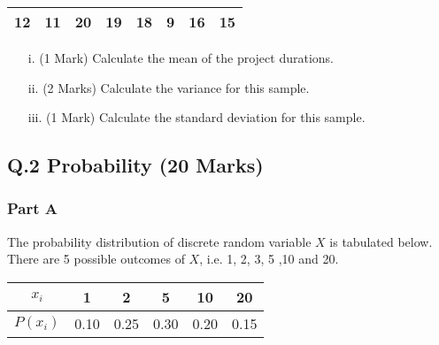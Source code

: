 \documentclass[a4paper,12pt]{article}
\begin{document}
\begin{table}[ht]
\begin{center}
\begin{tabular}{|rrrrrrrr|}

\hline
12 & 11 & 20 & 19 & 18 & 9 & 16 & 15 \\
\hline
\end{tabular}
\end{center}
\end{table}
\vspace{-0.5cm}


\begin{itemize}
\item[i.](1 Mark) Calculate the mean of the project durations.
\item[ii.](2 Marks) Calculate the variance for this sample.
\item[iii.](1 Mark) Calculate the standard deviation for this sample.
\end{itemize}





%

\newpage
\subsection*{Q.2 Probability (20 Marks)}
\subsubsection*{Part A}
 The probability distribution of discrete random variable $X$ is tabulated below. There are 5 possible outcomes of $X$, i.e. 1, 2, 3, 5 ,10 and 20.
\begin{center}
\begin{tabular}{|c||c|c|c|c|c|}
\hline
$x_i$  & 1 & 2 & 5 & 10 & 20 \\\hline
$P(x_i)$ &  0.10 & 0.25 & 0.30& 0.20 &0.15\\

\hline
\end{tabular}
\end{center}
\end{document}
